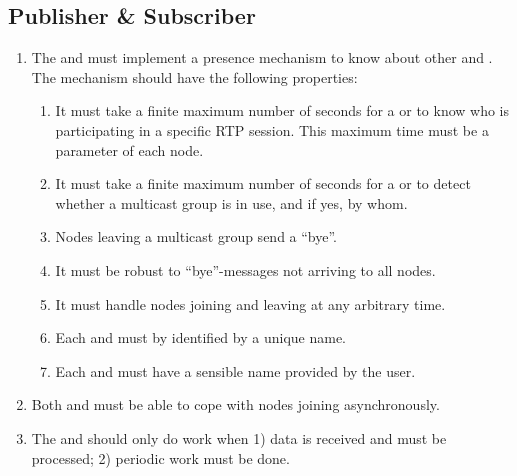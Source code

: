 \subsection{Publisher \& Subscriber}
\begin{enumerate}[ref=R-A-PS-\arabic* on P.\thepage]
		\item \label{req:a:pubsub:presence} The  and  must implement a presence mechanism to know about other  and . The mechanism should have the following properties:
	\begin{enumerate}
		\item It must take a finite maximum number of seconds for a  or  to know who is participating in a specific RTP session. This maximum time must be a parameter of each node.
		\item It must take a finite maximum number of seconds for a  or  to detect whether a multicast group is in use, and if yes, by whom.
		\item Nodes leaving a multicast group send a ``bye''.
		\item It must be robust to ``bye''-messages not arriving to all nodes.
		\item It must handle nodes joining and leaving at any arbitrary time.
		\item Each \pub{} and \sub{} must by identified by a unique name.
 		\item Each \pub{} and \sub{} must have a sensible name provided by the user.
	\end{enumerate}
	\item Both  and  must be able to cope with nodes joining asynchronously.
	\item The \pubs{} and \subs{} should only do work when 1) data is received and must be processed; 2) periodic work must be done. \label{req:a:pubsub:event}
\end{enumerate}


